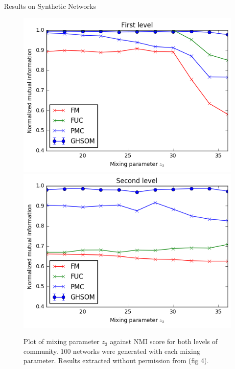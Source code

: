 \documentclass{beamer}
\begin{document}
	\begin{frame}{Results on Synthetic Networks}
		\begin{figure}
			\centering
			\includegraphics[scale=0.45]{first_level.png}
			\includegraphics[scale=0.45]{second_level.png}
			\caption{Plot of mixing parameter $z_3$ against NMI score for both levels of community. 100 networks were generated with each mixing parameter. Results extracted without permission from \protect			\cite{yang2013hierarchical} (fig 4).}
			\label{synthetic_experiment}
		\end{figure}
	\end{frame}
	
\end{document}
